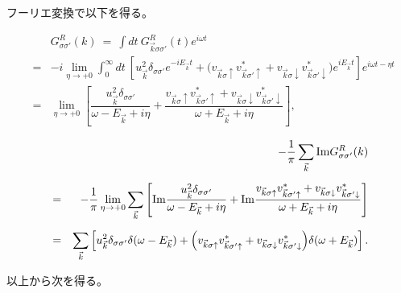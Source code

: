 \documentclass[uplatex,a4j,12pt,dvipdfmx]{jsarticle}
\begin{document}
フーリエ変換で以下を得る。

\begin{eqnarray}
	&&
	G^{R}_{\sigma \sigma'}(k)
	\ = \
	\int \! dt \
	G^{R}_{\vec{k} \sigma \sigma'}(t)
	e^{i \omega t}
	\nonumber \\[4mm] &=&
	-
	i
	\lim_{\eta \to +0}
	\int^{\infty}_{0} \!\! dt \
	\left[
		u_{\vec{k}}^{2}
		\delta_{\sigma \sigma'}
		e^{ - i E_{\vec{k}} t }
		+
		\Big(
		v_{\vec{k} \sigma \uparrow}
		v_{\vec{k} \sigma' \uparrow}^{*}
		+
		v_{\vec{k} \sigma \downarrow}
		v_{\vec{k} \sigma' \downarrow}^{*}
		\Big)
		e^{ i E_{\vec{k}} t }
		\right]
	e^{i \omega t - \eta t}
	\nonumber \\[4mm] &=&
	\lim_{\eta \to +0}
	\left[
		\dfrac{
			u_{\vec{k}}^{2}
			\delta_{\sigma \sigma'}
		}{ \omega - E_{\vec{k}} + i \eta }
		+
		\dfrac{
			v_{\vec{k} \sigma \uparrow}
			v_{\vec{k} \sigma' \uparrow}^{*}
			+
			v_{\vec{k} \sigma \downarrow}
			v_{\vec{k} \sigma' \downarrow}^{*}
		}{ \omega + E_{\vec{k}} + i \eta }
		\right]
	,
\end{eqnarray}

\begin{eqnarray}
	&&
	- \dfrac{ 1 }{ \pi }
	\sum_{\vec{k}}
	{\rm Im} G^{R}_{\sigma \sigma'}(k)
	\nonumber \\[2mm] &=&
	-
	\dfrac{1}{\pi}
	\lim_{\eta \to +0}
	\sum_{\vec{k}}
	\left[
	{\rm Im}
	\dfrac{
		u_{\vec{k}}^{2}
		\delta_{\sigma \sigma'}
	}{ \omega - E_{\vec{k}} + i \eta }
	+
	{\rm Im}
	\dfrac{
		v_{\vec{k} \sigma \uparrow}
		v_{\vec{k} \sigma' \uparrow}^{*}
		+
		v_{\vec{k} \sigma \downarrow}
		v_{\vec{k} \sigma' \downarrow}^{*}
	}{ \omega + E_{\vec{k}} + i \eta }
	\right]
	\nonumber \\[2mm] &=&
	\sum_{\vec{k}}
	\left[
		u_{\vec{k}}^{2}
		\delta_{\sigma \sigma'}
		\delta( \omega - E_{\vec{k}} )
		+
		\Big(
		v_{\vec{k} \sigma \uparrow}
		v_{\vec{k} \sigma' \uparrow}^{*}
		+
		v_{\vec{k} \sigma \downarrow}
		v_{\vec{k} \sigma' \downarrow}^{*}
		\Big)
		\delta( \omega + E_{\vec{k}} )
		\right]
	.
\end{eqnarray}


以上から次を得る。
\end{document}
